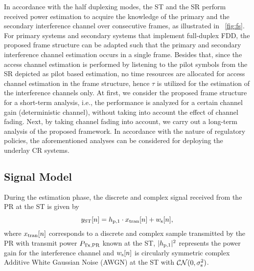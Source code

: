 In accordance with the half duplexing modes, the ST and the SR perform received power estimation to acquire the knowledge of the primary and the secondary interference channel over consecutive frames, as illustrated in \figurename~\ref{fig:fs}. For primary systems and secondary systems that implement full-duplex FDD, the proposed frame structure can be adapted such that the primary and secondary interference channel estimation occurs in a single frame. Besides that, since the access channel estimation is performed by listening to the pilot symbols from the SR depicted as pilot based estimation, no time resources are allocated for access channel estimation in the frame structure, hence $\tau$ is utilized for the estimation of the interference channels only. 
At first, we consider the proposed frame structure for a short-term analysis, i.e., the performance is analyzed for a certain channel gain (deterministic channel), without taking into account the effect of channel fading. Next, by taking channel fading into account, we carry out a long-term analysis of the proposed framework. In accordance with the nature of regulatory policies, the aforementioned analyses can be considered for deploying the underlay CR systems. 




\subsection{Signal Model}
During the estimation phase, the discrete and complex signal received from the PR at the ST is given by
\begin{equation}
y_{\text{ST}}[n] = h_{\text{p,1}} \cdot x_{\text{tran}}[n] + w_{\text{s}}[n],
\label{eq:sys_mod_st}
\end{equation}
where $x_{\text{tran}}[n]$ corresponds to a discrete and complex sample transmitted by the PR with transmit power $P_{\text{Tx,PR}}$ known at the ST, $|h_{\text{p,1}}|^2$ represents the power gain for the interference channel and $w_{\text{s}}[n]$ is circularly symmetric complex Additive White Gaussian Noise (AWGN) at the ST with %
$\mathcal{CN}(0, \sigma^2_{\text{s}})$. %

